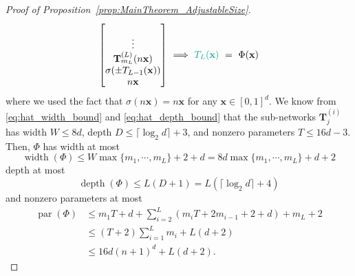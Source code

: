 \documentclass{article}
\numberwithin{equation}{section}
\theoremstyle{definition}
\begin{document}
\begin{proof}[Proof of Proposition~\ref{prop:MainTheorem_AdjustableSize}]
\begin{align*}
\begin{bmatrix}
    \\ 
    \vdots
    \\
    \mathbf{T}_{m_L}^{(L)}(n\mathbf{x})
    \\
    \sigma(\pm T_{L-1} (\mathbf{x}))
    \\
    n\mathbf{x}
    \end{bmatrix}
    \ \Longrightarrow \
    {\color{persiangreen}
    T_L(\mathbf{x})
    }
    \ = \ 
    \Phi(\mathbf{x})
\end{align*}
where we used the fact that $\sigma(n\mathbf{x}) = n\mathbf{x}$ for any $\mathbf{x}\in[0,1]^d$. We know from \eqref{eq:hat_width_bound} and \eqref{eq:hat_depth_bound} that the sub-networks $\mathbf{T}_j^{(i)}$ has width $W \le 8d$, depth $D \le \lceil \log_2{d} \rceil + 3$, and nonzero parameters $T \le 16d-3$. Then, $\Phi$ has width at most
\[
    \operatorname{width}(\Phi)
    \le
    W \max\{m_1,\cdots,m_L\} + 2 + d
    =
    8d \max\{m_1,\cdots,m_L\} + d + 2
\]
depth at most
\[
    \operatorname{depth}(\Phi)
    \le
    L (D+1)
    =
    L (\lceil \log_2{d} \rceil + 4)
\]
and nonzero parameters at most
\begin{align*}
    \operatorname{par}(\Phi)
    &\le
    m_1 T + d
    +
    \sum_{i=2}^L
    (m_i T + 2m_{i-1} + 2 + d)
    +
    m_L + 2
    \\
    &\le
    (T+2) \sum_{i=1}^L m_i + L(d+2)
    \\
    &\le
    16d(n+1)^d + L(d+2)
    .
\end{align*}

\end{proof}
\end{document}

